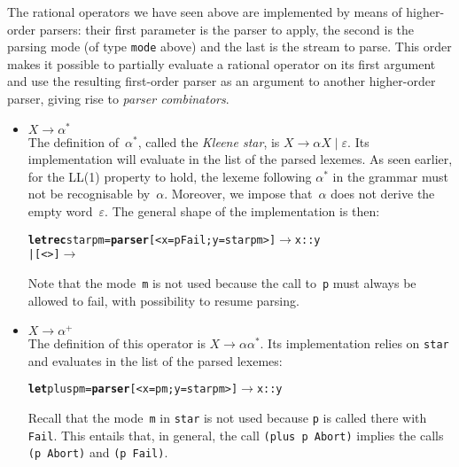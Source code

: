 The rational operators we have seen above are implemented by means of
higher\hyp{}order parsers: their first parameter is the parser to
apply, the second is the parsing mode (of type \texttt{mode} above)
and the last is the stream to parse. This order makes it possible to
partially evaluate a rational operator on its first argument and use
the resulting first\hyp{}order parser as an argument to another
higher\hyp{}order parser, giving rise to \emph{parser combinators}.
\begin{itemize}

  \item \(X \rightarrow \alpha^*\)\\ The definition of~\(\alpha^*\),
    called the \emph{Kleene star}, is \(X \rightarrow \alpha X \mid
    \varepsilon\). Its \OCaml implementation will evaluate in the list
    of the parsed lexemes. As seen earlier, for the LL(1) property to
    hold, the lexeme following \(\alpha^*\) in the grammar must not be
    recognisable by~\(\alpha\). Moreover, we impose that~\(\alpha\)
    does not derive the empty word~\(\varepsilon\). The general shape
    of the implementation is then:
\begin{alltt}
\textbf{let rec} star p m = \textbf{parser} [< x=p Fail; y=star p m >] \!\(\rightarrow\)\! x::y
                        |                       [<>] \!\(\rightarrow\) \![]
\end{alltt}
    Note that the mode~\texttt{m} is not used because the call
    to~\texttt{p} must always be allowed to fail, with possibility to
    resume parsing.

  \item \(X \rightarrow \alpha^+\)\\
     The definition of this operator is \(X \rightarrow \alpha
     \alpha^*\). Its \OCaml implementation relies on \texttt{star} and
     evaluates in the list of the parsed lexemes:
\begin{alltt}
\textbf{let} plus p m = \textbf{parser} [< x=p m; y=star p m >] \(\rightarrow\) x::y
\end{alltt}
     Recall that the mode~\texttt{m} in \texttt{star} is not used
     because \texttt{p} is called there with \texttt{Fail}. This
     entails that, in general, the call \texttt{(plus p Abort)} implies
     the calls \texttt{(p Abort)} and \texttt{(p Fail)}.


\end{itemize}
